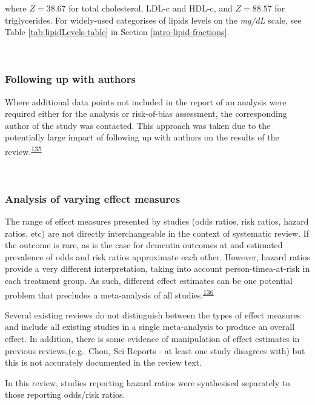 \documentclass[a4paper, twoside]{templates/ociamthesis}
\begin{document}
where \(Z = 38.67\) for total cholesterol, LDL-c and HDL-c, and \(Z = 88.57\) for triglycerides. For widely-used categorises of lipids levels on the \emph{mg/dL} scale, see Table \ref{tab:lipidLevels-table} in Section \ref{intro-lipid-fractions}.

~

\hypertarget{contacting-authors}{%
\subsubsection{Following up with authors}\label{contacting-authors}}

Where additional data points not included in the report of an analysis were required either for the analysis or risk-of-bias assessment, the corresponding author of the study was contacted. This approach was taken due to the potentially large impact of following up with authors on the results of the review.\textsuperscript{\protect\hyperlink{ref-reynders2019}{135}}

~

\hypertarget{analysis-of-varying-effect-measures}{%
\subsubsection{Analysis of varying effect measures}\label{analysis-of-varying-effect-measures}}

The range of effect measures presented by studies (odds ratios, risk ratios, hazard ratios, etc) are not directly interchangeable in the context of systematic review. If the outcome is rare, as is the case for dementia outcomes at and estimated prevalence of odds and risk ratios approximate each other. However, hazard ratios provide a very different interpretation, taking into account person-timea-at-risk in each treatment group. As such, different effect estimates can be one potential problem that precludes a meta-analysis of all studies.\textsuperscript{\protect\hyperlink{ref-mckenzie2019}{136}}

Several existing reviews do not distinguish between the types of effect measures and include all existing studies in a single meta-analysis to produce an overall effect. In addition, there is some evidence of manipulation of effect estimates in previous reviews,(e.g.~Chou, Sci Reports - at least one study disagrees with) but this is not accurately documented in the review text.

In this review, studies reporting hazard ratios were synthesised separately to those reporting odds/risk ratios.
\end{document}

